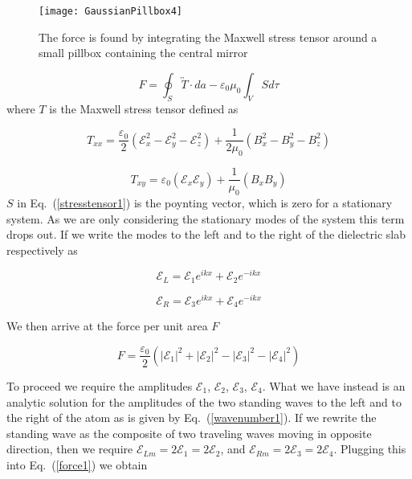 \documentclass[twocolumn,english,pra,aps,superscriptaddress,floatfix]{revtex4-1}
\begin{document}
\begin{figure}
\texttt{[image: GaussianPillbox4]}
\caption{The force is found by integrating the Maxwell stress tensor around a small pillbox containing the central mirror}
\label{fig:gaussianpillbox}
\end{figure}

\begin{equation}
F=\oint_{S}\overleftrightarrow{T}\cdot da-\varepsilon_{0}\mu_{0}\int_{V}Sd\tau
\label{stresstensor1}
\end{equation}
where $T$ is the Maxwell stress tensor defined as

\begin{equation}
T_{xx}=\frac{\varepsilon_{0}}{2}\left(\mathcal{E}_{x}^{2}-\mathcal{E}_{y}^{2}-\mathcal{E}_{z}^{2}\right)+\frac{1}{2\mu_{0}}\left(B_{x}^{2}-B_{y}^{2}-B_{z}^{2}\right)
\label{stresstensor2}
\end{equation}


\begin{equation}
T_{xy}=\varepsilon_{0}\left(\mathcal{E}_{x}\mathcal{E}_{y}\right)+\frac{1}{\mu_{0}}\left(B_{x}B_{y}\right)
\label{stresstensor3}
\end{equation}
$S$ in Eq.\ (\ref{stresstensor1}) is the poynting vector, which is zero for a stationary system.  As we are only considering the stationary modes of the system this term drops out.
If we write the modes to the left and to the right of the dielectric
slab respectively as

\begin{equation}
\mathcal{E}_{L}=\mathcal{E}_{1}e^{ikx}+\mathcal{E}_{2}e^{-ikx}
\label{Efieldleft}
\end{equation}


\begin{equation}
\mathcal{E}_{R}=\mathcal{E}_{3}e^{ikx}+\mathcal{E}_{4}e^{-ikx}
\label{EfieldRight}
\end{equation}

We then arrive at the force per unit area $F$ 

\begin{equation}
F=\frac{\varepsilon_{0}}{2}\left(\left|\mathcal{E}_{1}\right|^{2}+\left|\mathcal{E}_{2}\right|^{2}-\left|\mathcal{E}_{3}\right|^{2}-\left|\mathcal{E}_{4}\right|^{2}\right)
\label{force1}
\end{equation}

To proceed we require the amplitudes $\mathcal{E}_{1}$, $\mathcal{E}_{2}$, $\mathcal{E}_{3}$, $\mathcal{E}_{4}$. What we have instead is an analytic solution for the amplitudes
of the two standing waves to the left and to the right of the atom as is given by Eq.\ (\ref{wavenumber1}).
If we rewrite the standing wave as the composite of two traveling waves moving in opposite direction, then we require $\mathcal{E}_{Lm}=2\mathcal{E}_{1}=2\mathcal{E}_{2}$, and $\mathcal{E}_{Rm}=2\mathcal{E}_{3}=2\mathcal{E}_{4}$.
Plugging this into Eq.\ (\ref{force1}) we obtain
\end{document}
